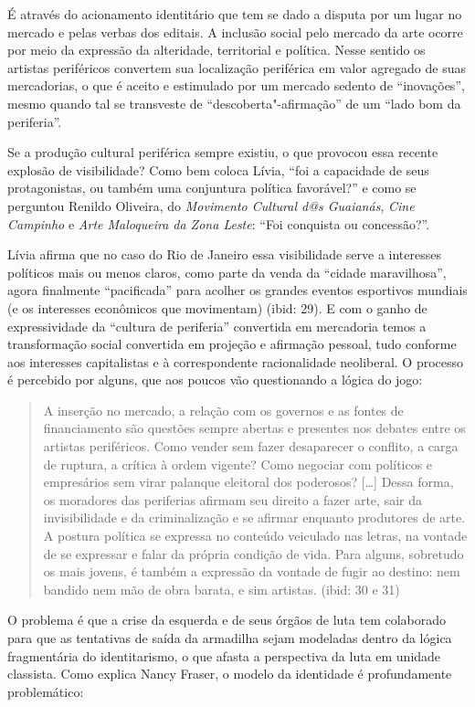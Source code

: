 É através do acionamento identitário que tem se dado a disputa por um
lugar no mercado e pelas verbas dos editais. A inclusão social pelo
mercado da arte ocorre por meio da expressão da alteridade, territorial
e política. Nesse sentido os artistas periféricos convertem sua
localização periférica em valor agregado de suas mercadorias, o que é
aceito e estimulado por um mercado sedento de ``inovações'', mesmo
quando tal se transveste de ``descoberta"-afirmação'' de um ``lado bom da
periferia''.

Se a produção cultural periférica sempre existiu, o que provocou essa
recente explosão de visibilidade? Como bem coloca Lívia, ``foi a
capacidade de seus protagonistas, ou também uma conjuntura política
favorável?'' e como se perguntou Renildo Oliveira, do \emph{Movimento
Cultural d@s Guaianás}, \emph{Cine Campinho} e \emph{Arte Maloqueira da
Zona Leste}: ``Foi conquista ou concessão?''.

Lívia afirma que no caso do Rio de Janeiro essa visibilidade serve a
interesses políticos mais ou menos claros, como parte da venda da
``cidade maravilhosa'', agora finalmente ``pacificada'' para acolher os
grandes eventos esportivos mundiais (e os interesses econômicos que
movimentam) (ibid: 29). E com o ganho de expressividade da ``cultura de
periferia'' convertida em mercadoria temos a transformação social
convertida em projeção e afirmação pessoal, tudo conforme aos interesses
capitalistas e à correspondente racionalidade neoliberal. O processo é
percebido por alguns, que aos poucos vão questionando a lógica do jogo:

\begin{quote}
A inserção no mercado, a relação com os governos e as fontes de
financiamento são questões sempre abertas e presentes nos debates entre
os artistas periféricos. Como vender sem fazer desaparecer o conflito, a
carga de ruptura, a crítica à ordem vigente? Como negociar com políticos
e empresários sem virar palanque eleitoral dos poderosos? {[}\ldots{}{]}
Dessa forma, os moradores das periferias afirmam seu direito a fazer
arte, sair da invisibilidade e da criminalização e se afirmar enquanto
produtores de arte. A postura política se expressa no conteúdo veiculado
nas letras, na vontade de se expressar e falar da própria condição de
vida. Para alguns, sobretudo os mais jovens, é também a expressão da
vontade de fugir ao destino: nem bandido nem mão de obra barata, e sim
artistas. (ibid: 30 e 31)
\end{quote}

O problema é que a crise da esquerda e de seus órgãos de luta tem
colaborado para que as tentativas de saída da armadilha sejam modeladas
dentro da lógica fragmentária do identitarismo, o que afasta a
perspectiva da luta em unidade classista. Como explica Nancy Fraser, o
modelo da identidade é profundamente problemático:

